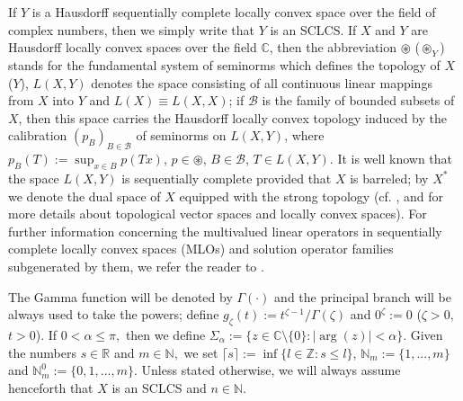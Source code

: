 \documentclass{amsart}
\theoremstyle{definition}
\theoremstyle{remark}
\numberwithin{equation}{section}
\begin{document}
 If $Y$ is a Hausdorff sequentially complete locally convex space over the field of complex numbers, then we simply write that $Y$ is an SCLCS.
If $X$ and $Y$ are Hausdorff locally convex spaces over the field ${\mathbb C}$, 
then the abbreviation $\circledast$ ($\circledast_{Y}$) stands for the fundamental system of seminorms which defines the topology of $X$ ($Y$), $L(X,Y)$ denotes the space consisting of all continuous linear mappings from $X$ into $Y$ and $L(X)\equiv L(X,X)$; if $\mathcal B$ is the family of bounded subsets of $X$, then this space carries the Hausdorff locally convex topology induced
by the calibration $(p_{B})_{B\in {\mathcal B}}$ of seminorms on $L(X,Y)$, where $p_B(T):=\sup_{x\in B}p(Tx)$, $p\in\circledast$, $B\in\mathcal B$, $T\in L(X,Y)$.
It is well known that the space $L(X,Y)$ is sequentially complete provided that $X$ is barreled; by $X^{\ast}$ we denote the dual space of $X$ equipped with the strong topology (cf. \cite{jarc}, \cite{meise} and \cite{trev} for more details about topological vector spaces and locally convex spaces). For further information concerning the multivalued linear operators in sequentially complete locally convex spaces (MLOs) and solution operator families subgenerated by them, we refer the reader to \cite{FKP}. 

The Gamma function will be denoted by $\Gamma(\cdot)$ and the principal branch will be always used to take the powers; define $g_{\zeta}(t):=t^{\zeta-1}/\Gamma(\zeta)$ and
$0^{\zeta}:=0$ ($\zeta>0,$ $t>0$). If $0<\alpha \leq \pi,$ then we define $\Sigma_{\alpha}:=\{z\in {\mathbb C} \setminus \{0\} : |\arg(z)|<\alpha\}.$
Given the numbers $s\in\mathbb R$ and $m\in {\mathbb N},$ we set $\lceil s\rceil:=\inf\{l\in\mathbb Z:s\leq l\}$, ${\mathbb N}_{m}:=\{1,...,m\} $ and ${\mathbb N}_{m}^{0}:=\{0,1,...,m\} .$ Unless stated otherwise, we will always assume henceforth that $X$ is an SCLCS and $n\in {\mathbb N}.$
\end{document}
